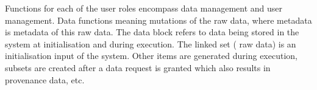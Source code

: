 Functions for each of the user roles encompass data management and user management.
Data functions meaning mutations of the raw \project{} data, where metadata is metadata of this raw data. 
The data block refers to data being stored in the system at initialisation and during execution.
The linked set (\ie{} raw data) is an initialisation input of the system.
Other items are generated during execution, \eg{} subsets are created after a data request is granted which also results in provenance data, etc.